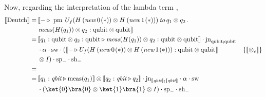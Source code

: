 Now, regarding the interpretation of the lambda term , 
\begin{equation}
  \begin{split}
  \llbracket  \text{Deutch}\rrbracket = \hspace{2pt} & \llbracket - \triangleright  \hspace{3pt} \text{pm} \hspace{4pt}  U_{f}(H  \hspace{2pt}   ( \textit{new}   \hspace{2pt}  0 \hspace{1pt}(*)) \otimes H  \hspace{2pt}   ( \textit{new}   \hspace{2pt}  1 \hspace{1pt}(*))) \hspace{2pt}  \textit{to} \hspace{2pt} q_{1} \otimes q_{2} \hspace{1pt}.   \\
  & \hspace{1pt}\textit{meas} (H( q_{1})) \otimes q_{2} : \text{qubit} \otimes \text{qubit}   \rrbracket \\
  =  \hspace{2pt}  & \llbracket q_1:\text{qubit} \otimes q_2:\text{qubit}  \triangleright \textit{meas} (H( q_{1})) \otimes q_{2} : \text{qubit} \otimes \text{qubit} \rrbracket \cdot \text{jn}_{\text{qubit}; \text{qubit}}     \\
  & \cdot \alpha  \cdot \text{sw}   \cdot ( \llbracket - \triangleright U_{f}(H  \hspace{2pt}  ( \textit{new}   \hspace{2pt}  0 \hspace{1pt}(*)) \otimes H  \hspace{2pt}   ( \textit{new}   \hspace{2pt}  1 \hspace{1pt}(*))): \text{qubit} \otimes \text{qubit}  \rrbracket &  \{\llbracket  \otimes_ e \rrbracket\}\\
  & \otimes I)  \cdot \text{sp}_{-} \cdot  \text{sh}_{-} \\ 
  =  \hspace{2pt}  &  \\
  =  \hspace{2pt}  & \llbracket q_1:\textit{qbit}\triangleright \text{meas}(q_1) \rrbracket \otimes \llbracket q_2:\textit{qbit} \triangleright q_2 \rrbracket  \cdot \text{jn}_{ \llbracket \textit{qbit}\rrbracket;  \llbracket\textit{qbit}\rrbracket} \cdot \alpha \cdot \text{sw}  \\
   &\cdot ( \ket{0}\bra{0} \otimes \ket{1}\bra{1} \otimes I) \cdot \text{sp}_{-} \cdot  \text{sh}_{-}
  \end{split}
\end{equation}


